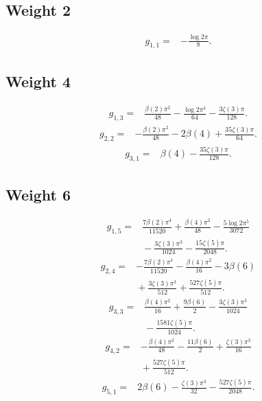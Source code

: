 \subsection*{Weight 2}
\begin{align*}g_{1,1}={}&- \frac{\log 2 \pi}{8}.\end{align*}
\subsection*{Weight 4}
\begin{align*}g_{1,3}={}&\frac{\beta(2) \pi^{2}}{48}- \frac{\log 2 \pi^{3}}{64}- \frac{3 \zeta(3) \pi}{128}.\end{align*}
\begin{align*}g_{2,2}={}&- \frac{\beta(2) \pi^{2}}{48}- 2 \beta(4)+\frac{35 \zeta(3) \pi}{64}.\end{align*}
\begin{align*}g_{3,1}={}&\beta(4)- \frac{35 \zeta(3) \pi}{128}.\end{align*}
\subsection*{Weight 6}
\begin{align*}g_{1,5}={}&\frac{7 \beta(2) \pi^{4}}{11520}+\frac{\beta(4) \pi^{2}}{48}- \frac{5 \log 2 \pi^{5}}{3072}\\
&{}- \frac{3 \zeta(3) \pi^{3}}{1024}- \frac{15 \zeta(5) \pi}{2048}.\end{align*}
\begin{align*}g_{2,4}={}&- \frac{7 \beta(2) \pi^{4}}{11520}- \frac{\beta(4) \pi^{2}}{16}- 3 \beta(6)\\
&{}+\frac{3 \zeta(3) \pi^{3}}{512}+\frac{527 \zeta(5) \pi}{512}.\end{align*}
\begin{align*}g_{3,3}={}&\frac{\beta(4) \pi^{2}}{16}+\frac{9 \beta(6)}{2}- \frac{3 \zeta(3) \pi^{3}}{1024}\\
&{}- \frac{1581 \zeta(5) \pi}{1024}.\end{align*}
\begin{align*}g_{4,2}={}&- \frac{\beta(4) \pi^{2}}{48}- \frac{11 \beta(6)}{2}+\frac{\zeta(3) \pi^{3}}{16}\\
&{}+\frac{527 \zeta(5) \pi}{512}.\end{align*}
\begin{align*}g_{5,1}={}&2 \beta(6)- \frac{\zeta(3) \pi^{3}}{32}- \frac{527 \zeta(5) \pi}{2048}.\end{align*}
